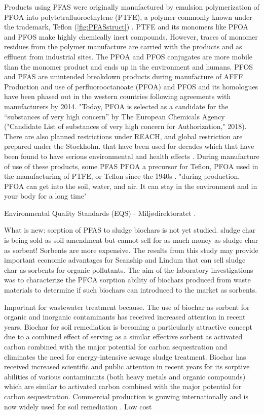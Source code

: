 Products using PFAS were originally manufactured by emulsion polymerization of PFOA into polytetrafluoroethylene (PTFE), a polymer commonly known under the trademark, Teflon\textsuperscript{\texttrademark} (\cref{fig:PFASstruct}) \citep{Lehmler2005}. PTFE and its monomers like PFOA and PFOS make highly chemically inert compounds. However, traces of monomer residues from the polymer manufacture are carried with the products and as effluent from industrial sites. The PFOA and PFOS conjugates are more mobile than the monomer product and ends up in the environment and humans. PFOS and PFAS are unintended breakdown products during manufacture of AFFF. Production and use of perfluorooctanoate (PFOA) and PFOS and its homologues have been phased out in the western countries following agreements with manufacturers by 2014. "Today, PFOA is selected as a candidate for the “substances of very high concern” by The European Chemicals Agency ("Candidate List of substances of very high concern for Authorization," 2018). There are also planned restrictions under REACH, and global restriction are prepared under the Stockholm.
that have been used for decades which that have been found to have serious environmental and health effects \citep{Lau2007}. During manufacture of use of these products, some PFAS
PFOA a precursor for Teflon, PFOA used in the manufacturing of PTFE, or Teflon since the 1940s \citep{lindstrom2011}. "during production, PFOA can get into the soil, water, and air. It can stay in the environment and in your body for a long time"

Environmental Quality Standards (EQS) - Miljødirektoratet \citep{EC2020PFAS}. \citep{MD2016workshop} \citep{MD2020EQS}

What is new: sorption of PFAS to sludge biochars is not yet studied. sludge char is being sold as soil amendment but cannot sell for as much money as sludge char as sorbent! Sorbents are more expensive. The results from this study may provide important economic advantages for Scanship and Lindum that can sell sludge char as sorbents for organic pollutants. The aim of the laboratory investigations was to characterize the PFCA sorption ability of biochars produced from waste materials to determine if such biochars can introduced to the market as sorbents. 

Important for wastewater treatment because. The use of biochar as sorbent for organic and inorganic contaminants has received increased attention in recent years. Biochar for soil remediation is becoming a particularly attractive concept due to a combined effect of serving as a similar effective sorbent as activated carbon combined with the major potential for carbon sequestration and eliminates the need for energy-intensive sewage sludge treatment. Biochar has received increased scientific and public attention in recent years for its sorptive abilities of various contaminants (both heavy metals and organic compounds) which are similar to activated carbon combined with the major potential for carbon sequestration. Commercial production is growing internationally and is now widely used for soil remediation \citep{Ahmad2014}. Low cost

